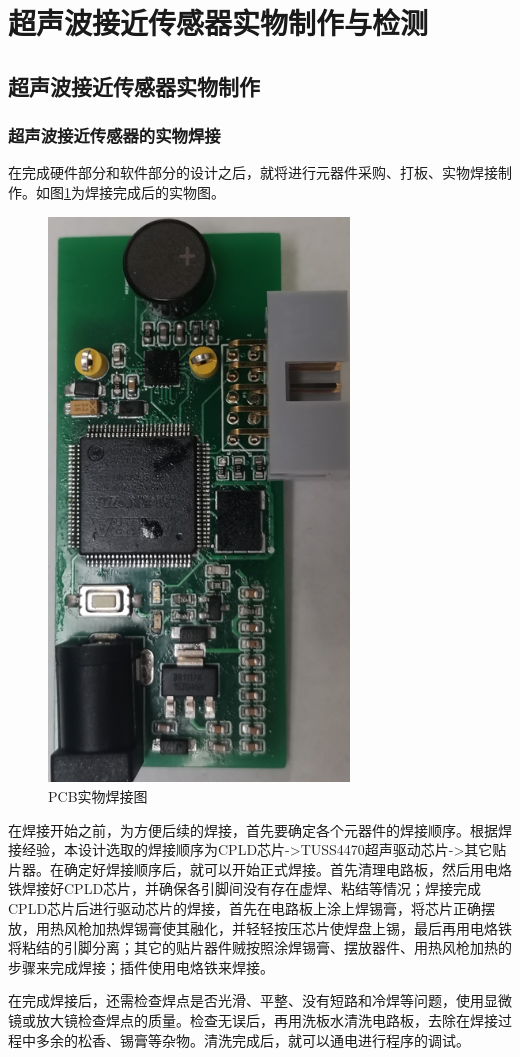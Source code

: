 \newpage
\section{超声波接近传感器实物制作与检测}
\subsection{超声波接近传感器实物制作}
\subsubsection{超声波接近传感器的实物焊接}
在完成硬件部分和软件部分的设计之后，就将进行元器件采购、打板、实物焊接制作。如图\ref{PCB实物焊接图}为焊接完成后的实物图。
\begin{figure}[!h]
	\centering
	\includegraphics[width=8cm,angle=-90]{figure/physical map.png}
	\caption{PCB实物焊接图}
	\label{PCB实物焊接图}
\end{figure}\par
在焊接开始之前，为方便后续的焊接，首先要确定各个元器件的焊接顺序。根据焊接经验，本设计选取的焊接顺序为CPLD芯片->TUSS4470超声驱动芯片->其它贴片器。在确定好焊接顺序后，就可以开始正式焊接。首先清理电路板，然后用电烙铁焊接好CPLD芯片，并确保各引脚间没有存在虚焊、粘结等情况；焊接完成CPLD芯片后进行驱动芯片的焊接，首先在电路板上涂上焊锡膏，将芯片正确摆放，用热风枪加热焊锡膏使其融化，并轻轻按压芯片使焊盘上锡，最后再用电烙铁将粘结的引脚分离；其它的贴片器件贼按照涂焊锡膏、摆放器件、用热风枪加热的步骤来完成焊接；插件使用电烙铁来焊接。\par
在完成焊接后，还需检查焊点是否光滑、平整、没有短路和冷焊等问题，使用显微镜或放大镜检查焊点的质量。检查无误后，再用洗板水清洗电路板，去除在焊接过程中多余的松香、锡膏等杂物。清洗完成后，就可以通电进行程序的调试。

